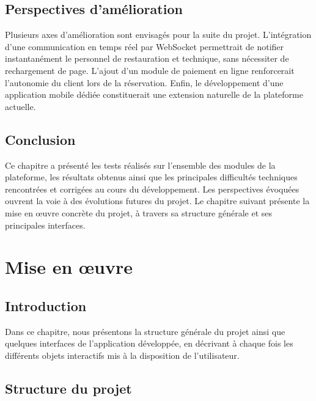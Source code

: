 \documentclass[12pt,a4paper]{report}
\begin{document}
\section{Perspectives d'amélioration}

Plusieurs axes d'amélioration sont envisagés pour la suite du projet.
L'intégration d'une communication en temps réel par WebSocket
permettrait de notifier instantanément le personnel de restauration et
technique, sans nécessiter de rechargement de page. L'ajout d'un module de
paiement en ligne renforcerait l'autonomie du client lors de la
réservation. Enfin, le développement d'une application mobile dédiée
constituerait une extension naturelle de la plateforme actuelle.

\section{Conclusion}

Ce chapitre a présenté les tests réalisés sur l'ensemble des modules de la
plateforme, les résultats obtenus ainsi que les principales difficultés
techniques rencontrées et corrigées au cours du développement. Les
perspectives évoquées ouvrent la voie à des évolutions futures du projet.
Le chapitre suivant présente la mise en œuvre concrète du projet, à
travers sa structure générale et ses principales interfaces.



\chapter{Mise en œuvre}

\section{Introduction}

Dans ce chapitre, nous présentons la structure générale du projet ainsi
que quelques interfaces de l'application développée, en décrivant à chaque
fois les différents objets interactifs mis à la disposition de
l'utilisateur.

\section{Structure du projet}
\end{document}
